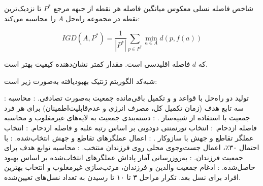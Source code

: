 
شاخص فاصله نسلی معکوس
میانگین فاصله هر نقطه از جبهه مرجع $P^*$ تا نزدیک‌ترین نقطه در مجموعه راه‌حل $A$
را محاسبه می‌کند:

\begin{equation}
IGD(A, P^*) = \frac{1}{|P^*|} \sum_{p \in P^*} \min_{a \in A} d(p, f(a))
\end{equation}

که $d$ فاصله اقلیدسی است. مقدار کمتر  نشان‌دهنده کیفیت بهتر است.



شبه‌کد الگوریتم ژنتیک بهبودیافته به‌صورت زیر است:

 :
تولید دو راه‌حل با قواعد  و 
و تکمیل باقی‌مانده جمعیت به‌صورت تصادفی.
 :
محاسبه سه تابع هدف (زمان تکمیل کل، مصرف انرژی و عدم‌قابلیت‌اطمینان)
برای هر فرد جمعیت با استفاده از شبیه‌ساز .
 :
دسته‌بندی جمعیت به لایه‌های غیرمغلوب و محاسبه فاصله ازدحام.
 :
انتخاب تورنمنتی دودویی بر اساس رتبه غلبه و فاصله ازدحام.
 :
انتخاب عملگر تقاطع و جهش با سازوکار .
 :
اعمال عملگرهای تقاطع و جهش انتخاب‌شده.
 :
با احتمال ۳۰٪، اعمال جست‌وجوی محلی روی فرزندان منتخب.
 :
محاسبه توابع هدف برای جمعیت فرزندان.
 :
به‌روزرسانی آمار پاداش عملگرهای انتخاب‌شده بر اساس بهبود حاصل‌شده.
 :
ادغام جمعیت والدین و فرزندان، مرتب‌سازی غیرمغلوب
و انتخاب بهترین افراد برای نسل بعد.
 تکرار مراحل ۳ تا ۱۰ تا رسیدن به تعداد نسل‌های تعیین‌شده.
